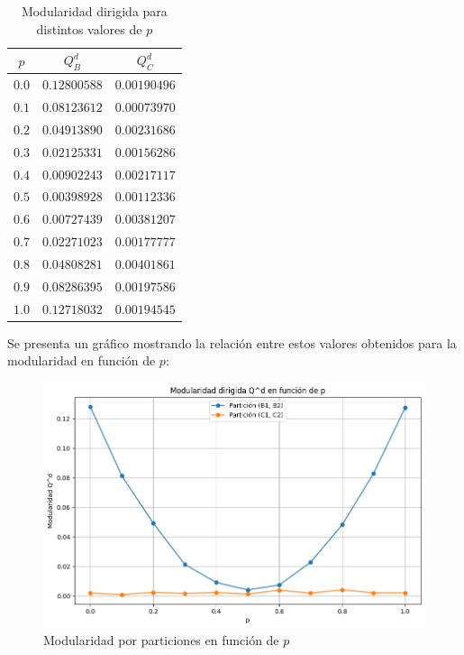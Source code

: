 \documentclass[12pt]{article}
\begin{document}
\begin{enumerate}
    \begin{table}[H]
        \centering
        \begin{tabular}{|c|c|c|}
            \hline
            \textbf{$p$} & \textbf{$Q_{B}^{d}$} & \textbf{$Q_{C}^{d}$} \\ \hline
            $0.0$ & $0.12800588$ & $0.00190496$ \\ \hline
            $0.1$ & $0.08123612$ & $0.00073970$ \\ \hline
            $0.2$ & $0.04913890$ & $0.00231686$ \\ \hline
            $0.3$ & $0.02125331$ & $0.00156286$ \\ \hline  
            $0.4$ & $0.00902243$ & $0.00217117$ \\ \hline
            $0.5$ & $0.00398928$ & $0.00112336$ \\ \hline
            $0.6$ & $0.00727439$ & $0.00381207$ \\ \hline
            $0.7$ & $0.02271023$ & $0.00177777$ \\ \hline
            $0.8$ & $0.04808281$ & $0.00401861$ \\ \hline
            $0.9$ & $0.08286395$ & $0.00197586$ \\ \hline
            $1.0$ & $0.12718032$ & $0.00194545$ \\ \hline
        \end{tabular}
        \caption{Modularidad dirigida para distintos valores de $p$}
        \label{tab:modularidad}
    \end{table}
    
    Se presenta un gráfico mostrando la relación entre estos valores obtenidos para la modularidad en función de $p$:

    \begin{figure}[H]
        \centering
        \includegraphics[scale=0.5]{images/modularidad_dirigida.png}
        \caption{Modularidad por particiones en función de $p$}
        \label{fig:grafico_modularidad}
    \end{figure}


\end{enumerate}
\end{document}
